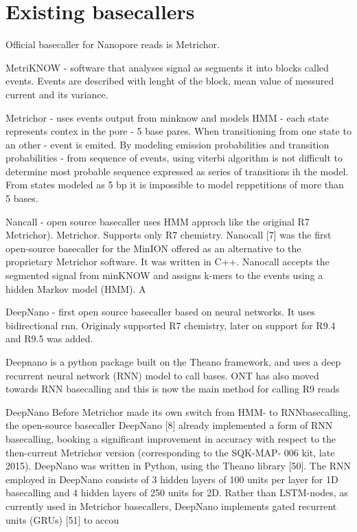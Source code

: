 \documentclass[times, utf8, diplomski, english]{fer}
\begin{document}
\section{Existing basecallers}

Official basecaller for Nanopore reads is Metrichor. 

MetriKNOW - software that analyses signal as segments it into blocks called events. Events are described with lenght of the block, mean value of messured current and its variance.

Metrichor - uses events output from minknow and models HMM  - each state represents contex in the pore - 5 base pares. When transitioning from one state to an other - event is emited. By modeling emission probabilities and transition probabilities - from sequence of events, using viterbi algorithm is not difficult to determine most probable sequence expressed as series of transitions ih the model.
From states modeled as 5 bp it is impossible to model reppetitions of more than 5 bases.


Nancall - open source basecaller uses HMM approch like the original R7 Metrichor). Metrichor. Supports only R7 chemistry. 
Nanocall [7] was the first open-source basecaller for the MinION offered as an alternative to the proprietary Metrichor software. It was written in C++. Nanocall accepts the segmented signal from minKNOW and assigns
k-mers to the events using a hidden Markov model (HMM). A

DeepNano - first open source basecaller based on neural networks. It uses bidirectional rnn. Originaly supported R7 chemistry, later on support for R9.4 and R9.5 was added.

Deepnano is a python package built on the Theano framework, and uses a deep recurrent neural network (RNN) model to call bases. ONT has also moved towards RNN basecalling and this is now the main method for calling R9 reads

DeepNano Before Metrichor made its own switch from HMM- to RNNbasecalling,
the open-source basecaller DeepNano [8] already implemented a
form of RNN basecalling, booking a significant improvement in accuracy with
respect to the then-current Metrichor version (corresponding to the SQK-MAP-
006 kit, late 2015).
 DeepNano was written in Python, using the Theano library
[50]. The RNN employed in DeepNano consists of 3 hidden layers of 100 units per
layer for 1D basecalling and 4 hidden layers of 250 units for 2D. Rather than
LSTM-nodes, as currently used in Metrichor basecallers, DeepNano implements
gated recurrent units (GRUs) [51] to accou
\end{document}
